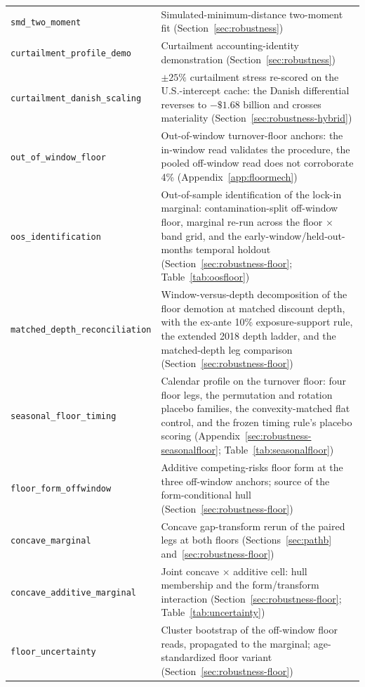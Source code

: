 \documentclass[12pt]{article}
\begin{document}
{\begin{longtable}{@{}p{5.4cm}p{8.8cm}@{}}
\texttt{smd\_two\_moment} & Simulated-minimum-distance two-moment fit (Section~\ref{sec:robustness}) \\
\texttt{curtailment\_profile\_demo} & Curtailment accounting-identity demonstration (Section~\ref{sec:robustness}) \\
\texttt{curtailment\_danish\_scaling} & $\pm 25\%$ curtailment stress re-scored on the U.S.-intercept cache: the Danish differential reverses to $-\$1.68$ billion and crosses materiality (Section~\ref{sec:robustness-hybrid}) \\
\texttt{out\_of\_window\_floor} & Out-of-window turnover-floor anchors: the in-window read validates the procedure, the pooled off-window read does not corroborate 4\% (Appendix~\ref{app:floormech}) \\
\texttt{oos\_identification} & Out-of-sample identification of the lock-in marginal: contamination-split off-window floor, marginal re-run across the floor $\times$ band grid, and the early-window/held-out-months temporal holdout (Section~\ref{sec:robustness-floor}; Table~\ref{tab:oosfloor}) \\
\texttt{matched\_depth\_reconciliation} & Window-versus-depth decomposition of the floor demotion at matched discount depth, with the ex-ante 10\% exposure-support rule, the extended 2018 depth ladder, and the matched-depth leg comparison (Section~\ref{sec:robustness-floor}) \\
\texttt{seasonal\_floor\_timing} & Calendar profile on the turnover floor: four floor legs, the permutation and rotation placebo families, the convexity-matched flat control, and the frozen timing rule's placebo scoring (Appendix~\ref{sec:robustness-seasonalfloor}; Table~\ref{tab:seasonalfloor}) \\
\texttt{floor\_form\_offwindow} & Additive competing-risks floor form at the three off-window anchors; source of the form-conditional hull (Section~\ref{sec:robustness-floor}) \\
\texttt{concave\_marginal} & Concave gap-transform rerun of the paired legs at both floors (Sections~\ref{sec:pathb} and~\ref{sec:robustness-floor}) \\
\texttt{concave\_additive\_marginal} & Joint concave $\times$ additive cell: hull membership and the form/transform interaction (Section~\ref{sec:robustness-floor}; Table~\ref{tab:uncertainty}) \\
\texttt{floor\_uncertainty} & Cluster bootstrap of the off-window floor reads, propagated to the marginal; age-standardized floor variant (Section~\ref{sec:robustness-floor}) \\

\end{longtable}}
\end{document}
